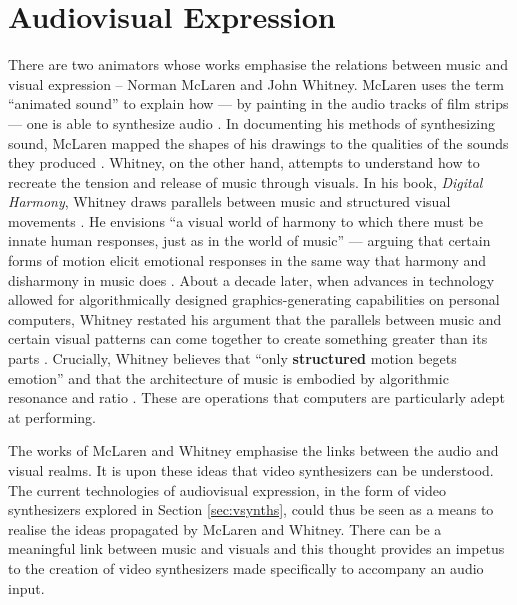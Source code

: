 \documentclass[../main_report1.tex]{subfiles}
\begin{document}
\section{Audiovisual Expression}
There are two animators whose works emphasise the relations between music and visual expression -- Norman McLaren and John Whitney. McLaren uses the term ``animated sound'' to explain how --- by painting in the audio tracks of film strips --- one is able to synthesize audio \cite{McLaren1953}. In documenting his methods of synthesizing sound, McLaren mapped the shapes of his drawings to the qualities of the sounds they produced \cite{McLaren1953}. Whitney, on the other hand, attempts to understand how to recreate the tension and release of music through visuals. In his book, \textit{Digital Harmony}, Whitney draws parallels between music and structured visual movements \cite{Whitney1980}. He envisions ``a visual world of harmony to which there must be innate human responses, just as in the world of music'' --- arguing that certain forms of motion elicit emotional responses in the same way that harmony and disharmony in music does \cite{Whitney1980}. About a decade later, when advances in technology allowed for algorithmically designed graphics-generating capabilities on personal computers, Whitney restated his argument that the parallels between music and certain visual patterns can come together to create something greater than its parts \cite{Whitney1991}. Crucially, Whitney believes that ``only \textbf{structured} motion begets emotion'' \cite{Whitney1980} and that the architecture of music is embodied by algorithmic resonance and ratio \cite{Whitney1991}. These are operations that computers are particularly adept at performing. \par

The works of McLaren and Whitney emphasise the links between the audio and visual realms. It is upon these ideas that video synthesizers can be understood. The current technologies of audiovisual expression, in the form of video synthesizers explored in Section \ref{sec:vsynths}, could thus be seen as a means to realise the ideas propagated by McLaren and Whitney. There can be a meaningful link between music and visuals and this thought provides an impetus to the creation of video synthesizers made specifically to accompany an audio input.
\end{document}
